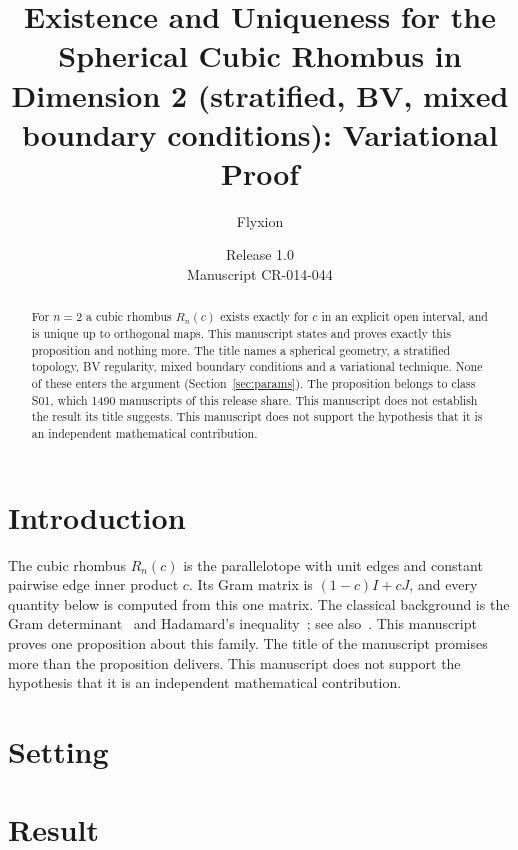 \documentclass[11pt]{article}
\title{Existence and Uniqueness for the Spherical Cubic Rhombus in Dimension 2 (stratified, BV, mixed boundary conditions): Variational Proof}
\author{Flyxion}
\date{Release 1.0\\ Manuscript CR-014-044}
\begin{document}
\maketitle
\begin{abstract}
For $n=2$ a cubic rhombus $R_n(c)$ exists exactly for $c$ in an explicit open interval, and is unique up to orthogonal maps. This manuscript states and proves exactly this proposition and nothing more. The title names a spherical geometry, a stratified topology, BV regularity, mixed boundary conditions and a variational technique. None of these enters the argument (Section~\ref{sec:params}). The proposition belongs to class S01, which 1490 manuscripts of this release share. This manuscript does not establish the result its title suggests. This manuscript does not support the hypothesis that it is an independent mathematical contribution.
\end{abstract}

\section{Introduction}
The cubic rhombus $R_n(c)$ is the parallelotope with unit edges and constant pairwise edge inner product $c$. Its Gram matrix is $(1-c)I+cJ$, and every quantity below is computed from this one matrix. The classical background is the Gram determinant~\cite{gram} and Hadamard's inequality~\cite{hadamard}; see also~\cite{hj}.
This manuscript proves one proposition about this family. The title of the manuscript promises more than the proposition delivers. This manuscript does not support the hypothesis that it is an independent mathematical contribution.

\section{Setting}


\section{Result}

\end{document}
